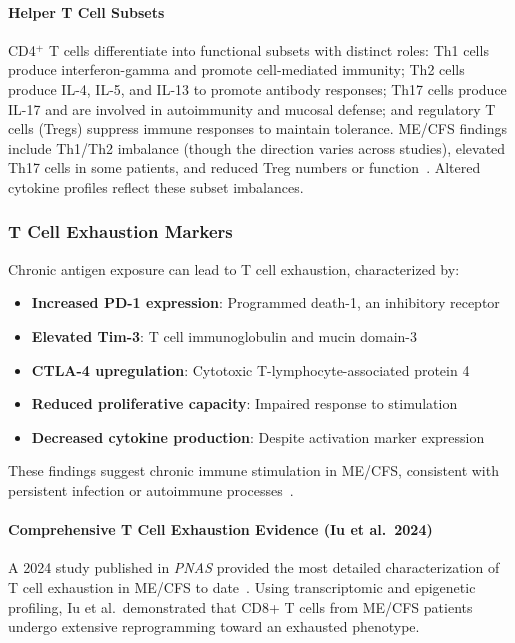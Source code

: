 \paragraph{Helper T Cell Subsets}
CD4$^{+}$ T cells differentiate into functional subsets with distinct roles: Th1 cells produce interferon-gamma and promote cell-mediated immunity; Th2 cells produce IL-4, IL-5, and IL-13 to promote antibody responses; Th17 cells produce IL-17 and are involved in autoimmunity and mucosal defense; and regulatory T cells (Tregs) suppress immune responses to maintain tolerance. ME/CFS findings include Th1/Th2 imbalance (though the direction varies across studies), elevated Th17 cells in some patients, and reduced Treg numbers or function~\cite{EatonFitch2019,Brenu2012miRNA}. Altered cytokine profiles reflect these subset imbalances.

\subsubsection{T Cell Exhaustion Markers}

Chronic antigen exposure can lead to T cell exhaustion, characterized by:
\begin{itemize}
    \item \textbf{Increased PD-1 expression}: Programmed death-1, an inhibitory receptor~\cite{iu2024tcell_exhaustion,walitt2024deep}
    \item \textbf{Elevated Tim-3}: T cell immunoglobulin and mucin domain-3~\cite{iu2024tcell_exhaustion}
    \item \textbf{CTLA-4 upregulation}: Cytotoxic T-lymphocyte-associated protein 4~\cite{iu2024tcell_exhaustion}
    \item \textbf{Reduced proliferative capacity}: Impaired response to stimulation~\cite{iu2024tcell_exhaustion}
    \item \textbf{Decreased cytokine production}: Despite activation marker expression~\cite{iu2024tcell_exhaustion}
\end{itemize}

These findings suggest chronic immune stimulation in ME/CFS, consistent with persistent infection or autoimmune processes~\cite{iu2024tcell_exhaustion}.

\paragraph{Comprehensive T Cell Exhaustion Evidence (Iu et al.\ 2024)}

A 2024 study published in \textit{PNAS} provided the most detailed characterization of T cell exhaustion in ME/CFS to date~\cite{iu2024tcell_exhaustion}. Using transcriptomic and epigenetic profiling, Iu et al.\ demonstrated that CD8+ T cells from ME/CFS patients undergo extensive reprogramming toward an exhausted phenotype.


